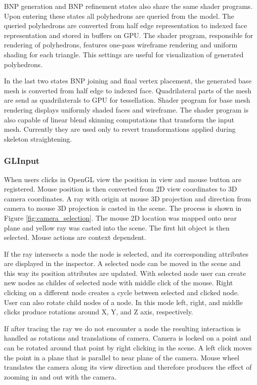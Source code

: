 BNP generation and BNP refinement states also share the same shader programs.
Upon entering these states all polyhedrons are queried from the model.
The queried polyhedrons are converted from half edge representation to indexed face representation and stored in buffers on GPU.
The shader program, responsible for rendering of polyhedrons, features one-pass wireframe rendering and uniform shading for each triangle.
This settings are useful for visualization of generated polyhedrons.

In the last two states BNP joining and final vertex placement, the generated base mesh is converted from half edge to indexed face.
Quadrilateral parts of the mesh are send as quadrilaterals to GPU for tessellation.
Shader program for base mesh rendering displays uniformly shaded faces and wireframe.
The shader program is also capable of linear blend skinning computations that transform the input mesh.
Currently they are used only to revert transformations applied during skeleton straightening.

\subsubsection{GLInput}

When users clicks in OpenGL view the position in view and mouse button are registered.
Mouse position is then converted from 2D view coordinates to 3D camera coordinates.
A ray with origin at mouse 3D projection and direction from camera to mouse 3D projection is casted in the scene.
The process is shown in Figure \ref{fig:camera_selection}.
The mouse 2D location was mapped onto near plane and yellow ray was casted into the scene.
The first hit object is then selected.
Mouse actions are context dependent.

If the ray intersects a node the node is selected, and its corresponding attributes are displayed in the inspector.
A selected node can be moved in the scene and this way its position attributes are updated.
With selected node user can create new nodes as childes of selected node with middle click of the mouse.
Right clicking on a different node creates a cycle between selected and clicked node.
User can also rotate child nodes of a node.
In this mode left, right, and middle clicks produce rotations around X, Y, and Z axis, respectively.

If after tracing the ray we do not encounter a node the resulting interaction is handled as rotations and translations of camera.
Camera is locked on a point and can be rotated around that point by right clicking in the scene.
A left click moves the point in a plane that is parallel to near plane of the camera.
Mouse wheel translates the camera along its view direction and therefore produces the effect of zooming in and out with the camera.

